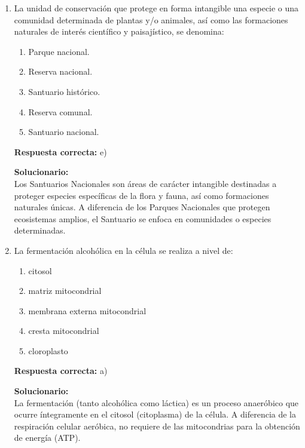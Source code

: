 \begin{enumerate}

	\item La unidad de conservación que protege en forma intangible una especie o una comunidad determinada de plantas y/o animales, así como las formaciones naturales de interés científico y paisajístico, se denomina:
	
	\begin{enumerate}[label=\alph*)]
		\item Parque nacional.
		\item Reserva nacional.
		\item Santuario histórico.
		\item Reserva comunal.
		\item Santuario nacional.
	\end{enumerate}
	
	\textbf{Respuesta correcta:} e)
	
	\vspace{2mm}
	\textbf{Solucionario:}\\
	Los Santuarios Nacionales son áreas de carácter intangible destinadas a proteger especies específicas de la flora y fauna, así como formaciones naturales únicas. A diferencia de los Parques Nacionales que protegen ecosistemas amplios, el Santuario se enfoca en comunidades o especies determinadas.
	
	\vspace{6mm}
	
	\item La fermentación alcohólica en la célula se realiza a nivel de:
	
	\begin{enumerate}[label=\alph*)]
		\item citosol
		\item matriz mitocondrial
		\item membrana externa mitocondrial
		\item cresta mitocondrial
		\item cloroplasto
	\end{enumerate}
	
	\textbf{Respuesta correcta:} a)
	
	\vspace{2mm}
	\textbf{Solucionario:}\\
	La fermentación (tanto alcohólica como láctica) es un proceso anaeróbico que ocurre íntegramente en el citosol (citoplasma) de la célula. A diferencia de la respiración celular aeróbica, no requiere de las mitocondrias para la obtención de energía (ATP).
	
	\vspace{6mm}
\end{enumerate}




